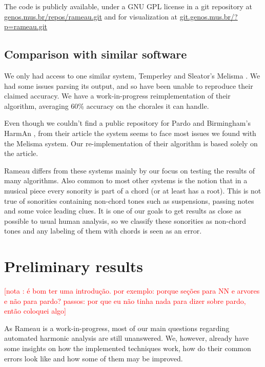 \documentclass{article}
\newcounter{notacounter}
\newcommand{\nota}[1]{
  \addtocounter{notacounter}{1}
  \textcolor{red}{[nota \arabic{notacounter}: #1]}
}
\begin{document}
The code is publicly available, under a GNU GPL \cite{fsf:gpl} license
in a git \cite{baudis:_git_users_manual} repository at
\url{genos.mus.br/repos/rameau.git} and for visualization at
\url{git.genos.mus.br/?p=rameau.git}

\subsection{Comparison with similar software}
\label{sec:differences-from-similar-software}

We only had access to one similar system, Temperley and Sleator's
Melisma \cite{temperley99:modeling}. We had some issues parsing its
output, and so have been unable to reproduce their claimed
accuracy. We have a work-in-progress reimplementation of their
algorithm, averaging 60\% accuracy on the chorales it can handle.

Even though we couldn't find a public repository for Pardo and
Birmingham's HarmAn \cite{pardo99:automated}, from their article the
system seems to face most issues we found with the Melisma system. Our
re-implementation of their algorithm is based solely on the article.

Rameau differs from these systems mainly by our focus on testing the
results of many algorithms. Also common to most other systems is the
notion that in a musical piece every sonority is part of a chord (or
at least has a root). This is not true of sonorities containing
non-chord tones such as suspensions, passing notes and some voice
leading clues. It is one of our goals to get results as close as
possible to usual human analysis, so we classify these sonorities as
non-chord tones and any labeling of them with chords is seen as an
error.

\section{Preliminary results}
\label{sec:analysis-results}

\nota{é bom ter uma introdução. por exemplo: porque seções para NN e
  arvores e não para pardo? passos: por que eu não tinha nada para
  dizer sobre pardo, então coloquei algo}

As Rameau is a work-in-progress, most of our main questions regarding
automated harmonic analysis are still unanswered. We, however, already
have some insights on how the implemented techniques work, how do
their common errors look like and how some of them may be improved.
\end{document}
